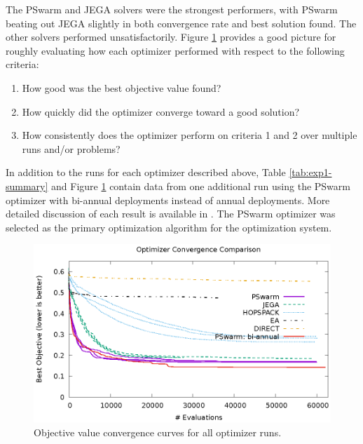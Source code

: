 The PSwarm and JEGA solvers were the strongest performers, with PSwarm beating
out JEGA slightly in both convergence rate and best solution found.  The other
solvers performed unsatisfactorily.  Figure \ref{fig:exp1-converge} provides a
good picture for roughly evaluating how each optimizer performed with respect
to the following criteria:

\begin{enumerate}

    \item How good was the best objective value found?

    \item How quickly did the optimizer converge toward a good solution?

    \item How consistently does the optimizer perform on criteria 1 and 2 over
        multiple runs and/or problems?

\end{enumerate}

In addition to the runs for each optimizer described above, Table
\ref{tab:exp1-summary} and Figure \ref{fig:exp1-converge} contain data from
one additional run using the PSwarm optimizer with bi-annual deployments
instead of annual deployments.  More detailed discussion of each result is
available in .  The PSwarm optimizer was selected as
the primary optimization algorithm for the \Cyclus optimization system.

\begin{figure}
    \centering
    \includegraphics[width=1.0\textwidth]{converge.eps}
    \captionsetup{justification=centering}
    \caption[Experiment 1: optimizer convergence curves]{Objective value convergence curves for all optimizer runs.}
    \label{fig:exp1-converge}
\end{figure}

